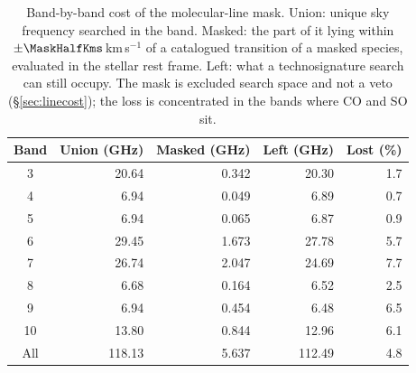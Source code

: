 \begin{table}
\centering
\footnotesize
\setlength{\tabcolsep}{4pt}
\caption{Band-by-band cost of the molecular-line mask. Union: unique sky frequency searched in the band. Masked: the part of it lying within $\pm\MaskHalfKms$\,km\,s$^{-1}$ of a catalogued transition of a masked species, evaluated in the stellar rest frame. Left: what a technosignature search can still occupy. The mask is excluded search space and not a veto (\S\ref{sec:linecost}); the loss is concentrated in the bands where CO and SO sit.}
\label{tab:maskband}
\begin{tabular}{@{}crrrr@{}}
\hline
Band & Union (GHz) & Masked (GHz) & Left (GHz) & Lost (\%) \\
\hline
3 & 20.64 & 0.342 & 20.30 & 1.7 \\
4 & 6.94 & 0.049 & 6.89 & 0.7 \\
5 & 6.94 & 0.065 & 6.87 & 0.9 \\
6 & 29.45 & 1.673 & 27.78 & 5.7 \\
7 & 26.74 & 2.047 & 24.69 & 7.7 \\
8 & 6.68 & 0.164 & 6.52 & 2.5 \\
9 & 6.94 & 0.454 & 6.48 & 6.5 \\
10 & 13.80 & 0.844 & 12.96 & 6.1 \\
\hline
All & 118.13 & 5.637 & 112.49 & 4.8 \\
\hline
\end{tabular}
\end{table}

